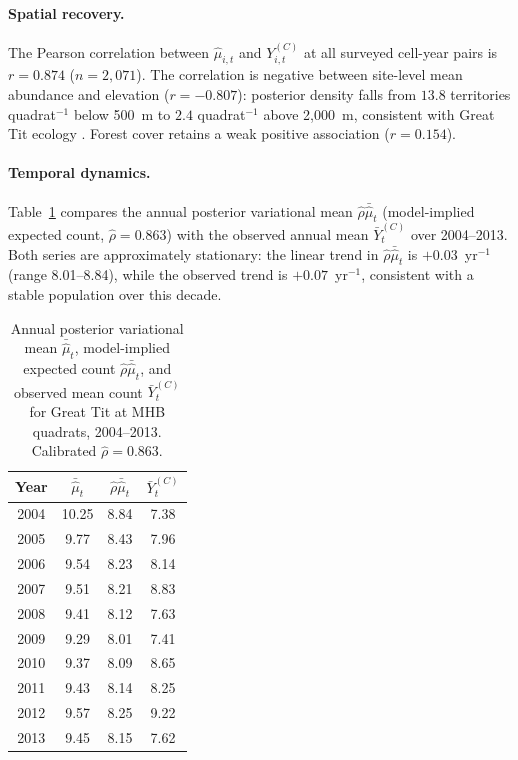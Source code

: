 \documentclass[review,12pt]{elsarticle}
\theoremstyle{definition}
\begin{document}
\paragraph{Spatial recovery.}
The Pearson correlation between $\hat\mu_{i,t}$ and $Y^{(C)}_{i,t}$ at all
surveyed cell-year pairs is $r=0.874$ ($n=2{,}071$).
The correlation is negative between site-level mean abundance and elevation
($r=-0.807$): posterior density falls from $13.8$ territories quadrat$^{-1}$
below 500~m to $2.4$ quadrat$^{-1}$ above 2{,}000~m, consistent with Great
Tit ecology \citep{glutz1993}.  Forest cover retains a weak positive
association ($r=0.154$).

\paragraph{Temporal dynamics.}
Table~\ref{tab:mhb-temporal} compares the annual posterior variational mean
$\hat\rho\bar{\hat\mu}_t$ (model-implied expected count,
$\hat\rho=0.863$) with the observed annual mean $\bar Y^{(C)}_t$ over
2004--2013.  Both series are approximately stationary: the linear trend in
$\hat\rho\bar{\hat\mu}_t$ is $+0.03$~yr$^{-1}$ (range 8.01--8.84), while
the observed trend is $+0.07$~yr$^{-1}$, consistent with a stable population
over this decade.

\begin{table}[t]
\centering
\caption{Annual posterior variational mean $\bar{\hat\mu}_t$, model-implied
expected count $\hat\rho\bar{\hat\mu}_t$, and observed mean count
$\bar Y^{(C)}_t$ for Great Tit at MHB quadrats, 2004--2013.
Calibrated $\hat\rho=0.863$.}
\label{tab:mhb-temporal}
\begin{tabular}{cccc}
\toprule
Year & $\bar{\hat\mu}_t$ & $\hat\rho\bar{\hat\mu}_t$ & $\bar Y^{(C)}_t$ \\
\midrule
2004 & 10.25 & 8.84 & 7.38 \\
2005 &  9.77 & 8.43 & 7.96 \\
2006 &  9.54 & 8.23 & 8.14 \\
2007 &  9.51 & 8.21 & 8.83 \\
2008 &  9.41 & 8.12 & 7.63 \\
2009 &  9.29 & 8.01 & 7.41 \\
2010 &  9.37 & 8.09 & 8.65 \\
2011 &  9.43 & 8.14 & 8.25 \\
2012 &  9.57 & 8.25 & 9.22 \\
2013 &  9.45 & 8.15 & 7.62 \\
\bottomrule
\end{tabular}
\end{table}
\end{document}
